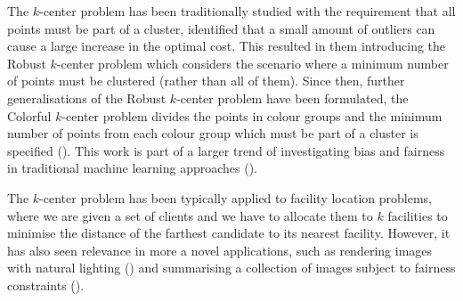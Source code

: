 The $k$-center problem has been traditionally studied with the requirement that all points must be part of a cluster, \textcite{charikar_algorithms_2001} identified that a small amount of outliers can cause a large increase in the optimal cost. This resulted in them introducing the Robust $k$-center problem which considers the scenario where a minimum number of points must be clustered (rather than all of them). Since then, further generalisations of the Robust $k$-center problem have been formulated, the Colorful $k$-center problem divides the points in colour groups and the minimum number of points from each colour group which must be part of a cluster is specified (\cite{bandyapadhyay_constant_2019}). This work is part of a larger trend of investigating bias and fairness in traditional machine learning approaches (\cite{mehrabi_survey_2019, anegg_technique_2020}).

The $k$-center problem has been typically applied to facility location problems, where we are given a set of clients and we have to allocate them to $k$ facilities to minimise the distance of the farthest candidate to its nearest facility. However, it has also seen relevance in more a novel applications, such as rendering images with natural lighting (\cite{agarwal_structured_2003}) and summarising a collection of images subject to fairness constraints (\cite{kleindessner_fair_2019}).

% 